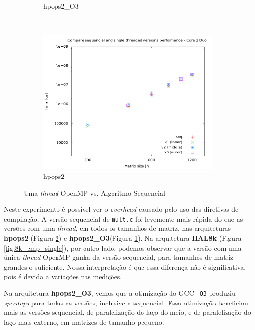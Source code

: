 \documentclass[a4paper, 12pt]{article}
\begin{document}
\begin{figure}[H]
\begin{subfigure}[H]{0.5\textwidth}
        \caption{hpops2\_O3}
        \label{fig:hpops2_O3_cmp_single}
    \end{subfigure}
    ~ %
    \begin{subfigure}[H]{0.5\textwidth}
        \includegraphics[width=\textwidth]{cmp_single_thread_hpops2}
        \caption{hpops2}
        \label{fig:hpops2_cmp_single}
    \end{subfigure}
    \caption{Uma \textit{thread} OpenMP vs. Algoritmo Sequencial}\label{fig:single_vs_openmp}
\end{figure}

Neste experimento é possível ver o \textit{overhead} causado pelo uso das
diretivas de compilação. A versão sequencial de \texttt{mult.c} foi levemente
mais rápida do que as versões com uma \textit{thread}, em todos os tamanhos de 
matriz, nas arquiteturas \textbf{hpops2} (Figura \ref{fig:hpops2_cmp_single}) e
\textbf{hpops2\_O3}(Figura \ref{fig:hpops2_O3_cmp_single}). Na arquitetura
\textbf{HAL8k} (Figura \ref{fig:8k_cmp_single}), por outro lado, podemos
observar que a versão com uma única \textit{thread} OpenMP ganha da
versão sequencial, para tamanhos de matriz grandes o suficiente. Nossa
interpretação é que essa diferença não é significativa, pois é devida a
variações nas medições.

Na arquitetura \textbf{hpops2\_O3}, vemos que a otimização do GCC \texttt{-O3}
produziu \textit{speedups} para todas as versões, inclusive a sequencial.
Essa otimização beneficiou mais as versões sequencial, de paralelização do
laço do meio, e de paralelização do laço mais externo, em matrizes de tamanho
pequeno.
\end{document}
